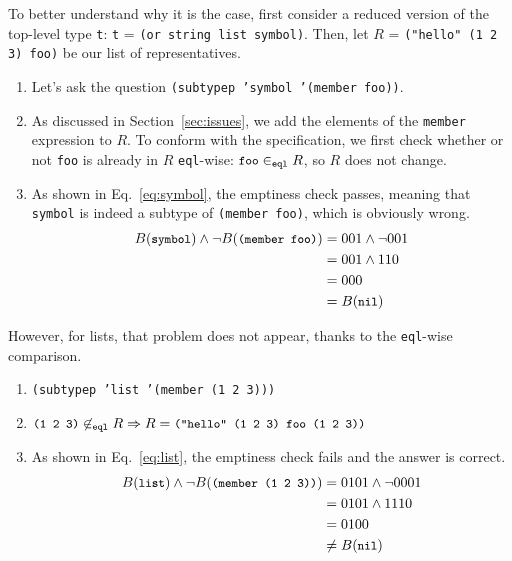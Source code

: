 \documentclass[format=sigconf]{acmart}
\newcommand\code[2][\small]{\sloppy\texttt{#1#2}}
\newcommand\mcode[2][\small]{\text{\code[#1]{#2}}}
\theoremstyle{definition}
\begin{document}
To better understand why it is the case, first consider a reduced version of the
top-level type \code{t}: \code{t} = \code{(or string list symbol)}. Then, let
$R$ = \code{("hello" (1 2 3) foo)} be our list of representatives.
\begin{enumerate}
\item Let's ask the question \code{(subtypep 'symbol '(member foo))}.
\item As discussed in Section~\ref{sec:issues}, we add the elements of the
  \code{member} expression to $R$. To conform with the specification, we first
  check whether or not \code{foo} is already in $R$ \code{eql}-wise:
  $\mcode{foo} \in_{\mcode[\scriptsize]{eql}} R$, so $R$ does not change.
\item As shown in Eq.~\ref{eq:symbol}, the emptiness check passes, meaning that
  \code{symbol} is indeed a subtype of \code{(member foo)}, which is obviously
  wrong.
  \begin{align}
    B(\mcode{symbol}) \wedge \neg B(\mcode{(member foo)}) &= 001 \wedge \neg 001 \label{eq:symbol}\\
                                                          &= 001 \wedge 110 \nonumber\\
                                                          &= 000 \nonumber\\
                                                          &= B(\mcode{nil}) \nonumber
  \end{align}
\end{enumerate}

However, for lists, that problem does not appear, thanks to the \code{eql}-wise
comparison.
\begin{enumerate}
\item \code{(subtypep 'list '(member (1 2 3)))}
\item $\mcode{(1 2 3)} \not\in_{\mcode[\scriptsize]{eql}} R \Rightarrow R =
  \mcode{("hello" (1 2 3) foo (1 2 3))}$
\item As shown in Eq.~\ref{eq:list}, the emptiness check fails and the answer is
  correct.
  \begin{align}
    B(\mcode{list}) \wedge \neg B(\mcode{(member (1 2 3))}) &= 0101 \wedge \neg 0001 \label{eq:list}\\
                                                            &= 0101 \wedge 1110 \nonumber\\
                                                            &= 0100 \nonumber\\
                                                            &\not= B(\mcode{nil}) \nonumber
  \end{align}
\end{enumerate}
\end{document}
